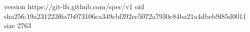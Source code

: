 version https://git-lfs.github.com/spec/v1
oid sha256:19a231223f6a7b073106ca349cbf392ec5072a7930c84ba21a4dbeb9f85d0011
size 2763
